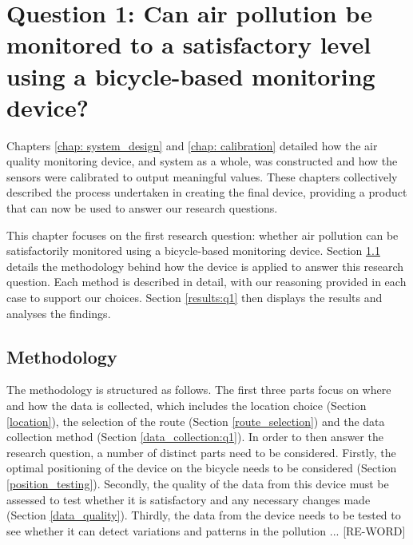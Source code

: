 \documentclass[11pt,twosided,a4paper]{report}
\begin{document}


\chapter[Bicycle-based monitoring]{Question 1: Can air pollution be monitored to a satisfactory level using a bicycle-based monitoring device?} \label{chap:q1}

Chapters \ref{chap: system_design} and \ref{chap: calibration} detailed how the air quality monitoring device, and system as a whole, was constructed and how the sensors were calibrated to output meaningful values. These chapters collectively described the process undertaken in creating the final device, providing a product that can now be used to answer our research questions.

This chapter focuses on the first research question: whether air pollution can be satisfactorily monitored using a bicycle-based monitoring device. Section \ref{meth:q1} details the methodology behind how the device is applied to answer this research question. Each method is described in detail, with our reasoning provided in each case to support our choices. Section \ref{results:q1} then displays the results and analyses the findings.

\section{Methodology} \label{meth:q1}

The methodology is structured as follows. The first three parts focus on where and how the data is collected, which includes the location choice (Section \ref{location}), the selection of the route (Section \ref{route_selection}) and the data collection method (Section \ref{data_collection:q1}). In order to then answer the research question, a number of distinct parts need to be considered. Firstly, the optimal positioning of the device on the bicycle needs to be considered (Section \ref{position_testing}). Secondly, the quality of the data from this device must be assessed to test whether it is satisfactory and any necessary changes made (Section \ref{data_quality}). Thirdly, the data from the device needs to be tested to see whether it can detect variations and patterns in the pollution ... [RE-WORD]
\end{document}

